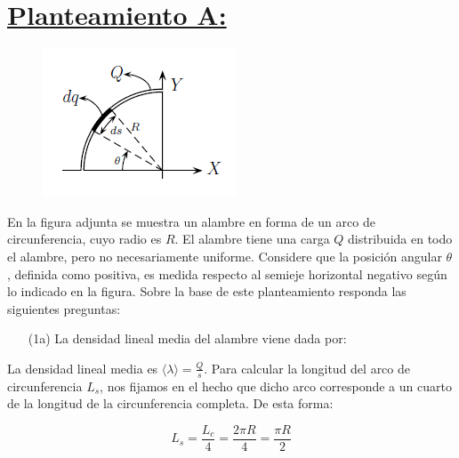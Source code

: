 \documentclass[a4paper,10pt]{article}
\begin{document}
\section*{\underline{Planteamiento A:}}

\begin{figure}
    \vspace{-15pt}
    \centering\includegraphics[width=\linewidth]{Graphics/PlanteamientoA.png}
    \vspace{-40pt}
\end{figure}

En la figura adjunta se muestra un alambre en forma
de un arco de circunferencia, cuyo radio es $R$. El alambre tiene una carga $Q$
distribuida en todo el alambre, pero no necesariamente uniforme. Considere
que la posición angular $\theta$, definida como positiva, es medida respecto al
semieje horizontal negativo según lo indicado en la figura. Sobre la base de
este planteamiento responda las siguientes preguntas:

\begin{itemize}
    \item[(1a)]La densidad lineal media del alambre viene dada por:
\end{itemize}

La densidad lineal media es $\langle\lambda\rangle=\frac{Q}{s}$.
Para calcular la longitud del arco de circunferencia $L_{s}$, nos fijamos en el hecho
que dicho arco corresponde a un cuarto de la longitud de la circunferencia completa.
De esta forma:

\begin{equation*}
    L_{s}=\frac{L_c}{4}=\frac{2\pi R}{4}=\frac{\pi R}{2}
\end{equation*}
\end{document}
